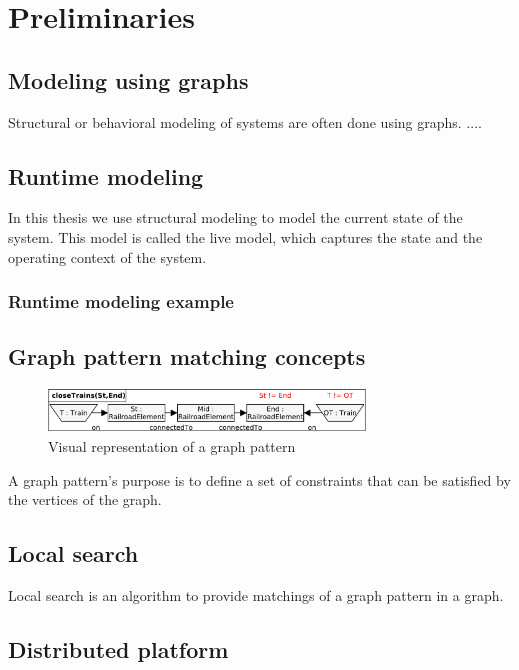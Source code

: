 
\chapter{Preliminaries}



\section{Modeling using graphs}

Structural or behavioral modeling of systems are often done using graphs. .... 

\section{Runtime modeling}

In this thesis we use structural modeling to model the current state of the system. This model is called the live model, which captures the state and the operating context of the system.

\subsection{Runtime modeling example}



\section{Graph pattern matching concepts}

\begin{figure}[h]
	\begin{center}
		\includegraphics[width=0.75\textwidth]{figures/pattern-visual.pdf}
		\caption{Visual representation of a graph pattern}
		\label{pattern-visual}
	\end{center}
\end{figure}

A graph pattern's purpose is to define a set of constraints that can be satisfied by the vertices of the graph.

\section{Local search}


Local search is an algorithm to provide matchings of a graph pattern in a graph.

\section{Distributed platform}



